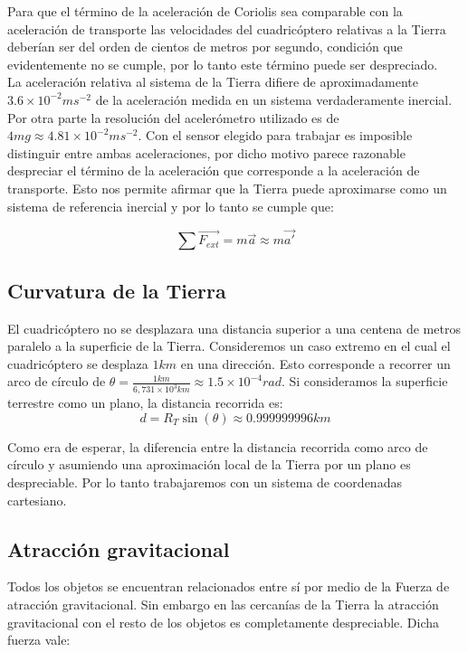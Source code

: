 \documentclass[main]{subfiles}
\begin{document}
Para que el t\'ermino de la aceleraci\'on de Coriolis sea comparable con la aceleraci\'on de transporte las velocidades del cuadric\'optero relativas a la Tierra deber\'ian ser del orden de cientos de metros por segundo, condici\'on que evidentemente no se cumple, por lo tanto este t\'ermino puede ser despreciado.\\ 

La aceleraci\'on relativa al sistema de la Tierra difiere de  aproximadamente $3.6\times10^{-2}ms^{-2}$ de la aceleraci\'on medida en un sistema verdaderamente inercial. Por otra parte la resoluci\'on del aceler\'ometro utilizado es de $4mg\approx 4.81\times10^{-2}ms^{-2}$. Con el sensor elegido para trabajar es imposible distinguir entre ambas aceleraciones, por dicho motivo parece razonable despreciar el t\'ermino de la aceleraci\'on que corresponde a la aceleraci\'on de transporte. Esto nos permite afirmar que la Tierra puede aproximarse como un sistema de referencia inercial y por lo tanto se cumple que:

\begin{equation}
\sum \vec{F_{ext}}=m\vec{a}\approx m\vec{a\prime}
\end{equation}



\subsection{Curvatura de la Tierra}
El cuadric\'optero no se desplazara una distancia superior a una centena de metros paralelo a la superficie de la Tierra. Consideremos un caso extremo en el cual el cuadric\'optero se desplaza $1km$ en una direcci\'on. Esto corresponde a recorrer un arco de c\'irculo de $\theta = \frac{1km}{6,731\times10^{3}km}\approx 1.5\times 10^{-4}rad$. Si consideramos la superficie terrestre como un plano, la distancia recorrida es: 
\begin{equation}
d=R_T\sin(\theta) \approx 0.999999996km
\end{equation}

Como era de esperar, la diferencia entre la distancia recorrida como arco de c\'irculo y asumiendo una aproximaci\'on local de la Tierra por un plano es despreciable. Por lo tanto trabajaremos con un sistema de coordenadas cartesiano.
\subsection{Atracci\'on gravitacional}
Todos los objetos se encuentran relacionados entre s\'i por medio de la Fuerza de atracci\'on gravitacional. Sin embargo en las cercan\'ias de la Tierra la atracci\'on gravitacional con el resto de los objetos es completamente despreciable. Dicha fuerza vale:
\end{document}
